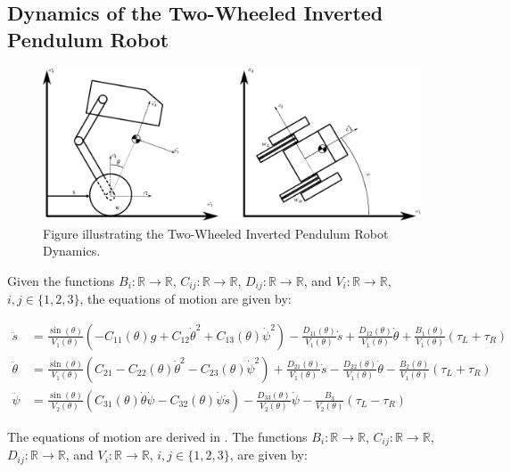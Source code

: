 	\subsection{Dynamics of the Two-Wheeled Inverted Pendulum Robot}
	\begin{figure}[h]
		\centering
		\includegraphics[width=1\textwidth]{TWIPR dynamics}
		\caption[Two-Wheeled Inverted Pendulum Robot Dynamics]{Figure illustrating the Two-Wheeled Inverted Pendulum Robot Dynamics.}
		\label{fig:Two-Wheeled Inverted Pendulum Robot Dynamics}
	\end{figure}

	Given the functions $B_i: \mathbb{R} \rightarrow \mathbb{R}$, $C_{ij}: \mathbb{R} \rightarrow \mathbb{R}$, $D_{ij}: \mathbb{R} \rightarrow \mathbb{R}$, and $V_i: \mathbb{R} \rightarrow \mathbb{R}$, $i,j \in \{1,2,3\}$, the equations of motion are given by:

	\begin{align}
		\ddot{s} &= \frac{\sin(\theta)}{V_1(\theta)} \left( -C_{11}(\theta)g + C_{12}\dot{\theta}^2 + C_{13}(\theta)\dot{\psi}^2 \right) - \frac{D_{11}(\theta)}{V_1(\theta)}\dot{s} + \frac{D_{12}(\theta)}{V_1(\theta)}\dot{\theta} + \frac{B_{1}(\theta)}{V_1(\theta)}(\tau_L + \tau_R) \\
		\ddot{\theta} &= \frac{\sin(\theta)}{V_1(\theta)} \left( C_{21} - C_{22}(\theta)\dot{\theta}^2 - C_{23}(\theta)\dot{\psi}^2 \right) + \frac{D_{21}(\theta)}{V_1(\theta)}\dot{s} - \frac{D_{22}(\theta)}{V_1(\theta)}\dot{\theta} - \frac{B_{2}(\theta)}{V_1(\theta)}(\tau_L + \tau_R)  \\
		\ddot{\psi} &= \frac{\sin(\theta)}{V_2(\theta)} \left( C_{31}(\theta)\dot{\theta}\dot{\psi} - C_{32}(\theta)\dot{\psi}\dot{s} \right) - \frac{D_{33}(\theta)}{V_2(\theta)}\dot{\psi} - \frac{B_{3}}{V_2(\theta)}(\tau_L - \tau_R)
	\end{align}


	The equations of motion are derived in \cite{kim2015dynamic}. The functions $B_i: \mathbb{R} \rightarrow \mathbb{R}$, $C_{ij}: \mathbb{R} \rightarrow \mathbb{R}$, $D_{ij}: \mathbb{R} \rightarrow \mathbb{R}$, and $V_i: \mathbb{R} \rightarrow \mathbb{R}$, $i,j \in \{1,2,3\}$, are given by:

